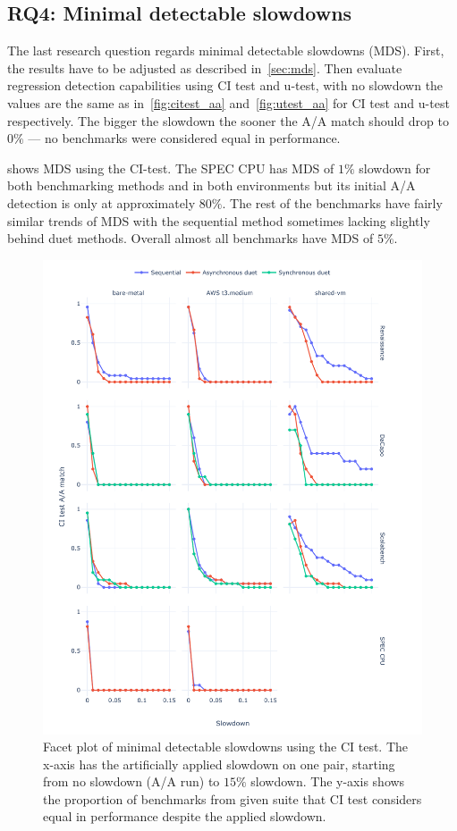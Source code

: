 \subsection{RQ4: Minimal detectable slowdowns}
\label{sec:rq4}

The last research question regards minimal detectable slowdowns (MDS).
First, the results have to be adjusted as described in~\cref{sec:mds}.
Then evaluate regression detection capabilities using CI test and \mbox{u-test}, with no slowdown the values are the same as in~\cref{fig:citest_aa} and~\cref{fig:utest_aa} for CI test and \mbox{u-test} respectively.
The bigger the slowdown the sooner the A/A match should drop to $0\%$ --- no benchmarks were considered equal in performance.

 shows MDS using the CI-test.
The SPEC CPU has MDS of $1\%$ slowdown for both benchmarking methods and in both environments but its initial A/A detection is only at approximately $80\%$.
The rest of the benchmarks have fairly similar trends of MDS with the sequential method sometimes lacking slightly behind duet methods.
Overall almost all benchmarks have MDS of $5\%$.

\begin{figure}
	\centering
	\includegraphics[width=1\linewidth]{./figures/mds_citest.pdf}
	\caption{
		Facet plot of minimal detectable slowdowns using the CI test.
		The \mbox{x-axis} has the artificially applied slowdown on one pair, starting from no slowdown (A/A run) to $15\%$ slowdown.
		The \mbox{y-axis} shows the proportion of benchmarks from given suite that CI test considers equal in performance despite the applied slowdown.
	}
	\label{fig:mds_citest}
\end{figure}

